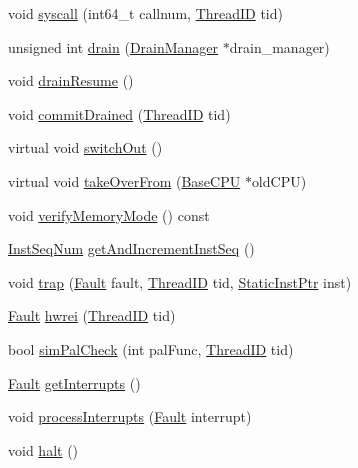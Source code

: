 \begin{DoxyCompactItemize}
\item 
void \hyperlink{classFullO3CPU_a2d6a2bbae85e604392f43b3418cdec97}{syscall} (int64\_\-t callnum, \hyperlink{base_2types_8hh_ab39b1a4f9dad884694c7a74ed69e6a6b}{ThreadID} tid)
\item 
unsigned int \hyperlink{classFullO3CPU_a4e932bfc8aa6dfb998b8496a0f04ace3}{drain} (\hyperlink{classDrainManager}{DrainManager} $\ast$drain\_\-manager)
\item 
void \hyperlink{classFullO3CPU_a8f020d3237536fe007fc488c4125c5d8}{drainResume} ()
\item 
void \hyperlink{classFullO3CPU_a07a52466ac4d8d91cbfb73b9ceb42988}{commitDrained} (\hyperlink{base_2types_8hh_ab39b1a4f9dad884694c7a74ed69e6a6b}{ThreadID} tid)
\item 
virtual void \hyperlink{classFullO3CPU_a05f299b443f8cc73a93d61572edc0218}{switchOut} ()
\item 
virtual void \hyperlink{classFullO3CPU_ac82d2b8d331b2e8e6854a95d2917dfa2}{takeOverFrom} (\hyperlink{classBaseCPU_1_1BaseCPU}{BaseCPU} $\ast$oldCPU)
\item 
void \hyperlink{classFullO3CPU_ae2e1ccebe596a180f8105d57f9a93645}{verifyMemoryMode} () const 
\item 
\hyperlink{inst__seq_8hh_a258d93d98edaedee089435c19ea2ea2e}{InstSeqNum} \hyperlink{classFullO3CPU_ace86a0dff0fe9648b7221e3a98fb4533}{getAndIncrementInstSeq} ()
\item 
void \hyperlink{classFullO3CPU_a23c9d89f64f4cfd6f48b106b99b119c4}{trap} (\hyperlink{classRefCountingPtr}{Fault} fault, \hyperlink{base_2types_8hh_ab39b1a4f9dad884694c7a74ed69e6a6b}{ThreadID} tid, \hyperlink{classRefCountingPtr}{StaticInstPtr} inst)
\item 
\hyperlink{classRefCountingPtr}{Fault} \hyperlink{classFullO3CPU_a3820de4f7e76b56c6d795f27bf49c097}{hwrei} (\hyperlink{base_2types_8hh_ab39b1a4f9dad884694c7a74ed69e6a6b}{ThreadID} tid)
\item 
bool \hyperlink{classFullO3CPU_a875eebdeba298f450fe84b0a05349afe}{simPalCheck} (int palFunc, \hyperlink{base_2types_8hh_ab39b1a4f9dad884694c7a74ed69e6a6b}{ThreadID} tid)
\item 
\hyperlink{classRefCountingPtr}{Fault} \hyperlink{classFullO3CPU_aa2bbcc75bdfc0f2355cd06731e6f5d69}{getInterrupts} ()
\item 
void \hyperlink{classFullO3CPU_ac3b13f31ae4a2de2b647e09c37a10822}{processInterrupts} (\hyperlink{classRefCountingPtr}{Fault} interrupt)
\item 
void \hyperlink{classFullO3CPU_ade0430439247877006d7df950f94918a}{halt} ()

\end{DoxyCompactItemize}
